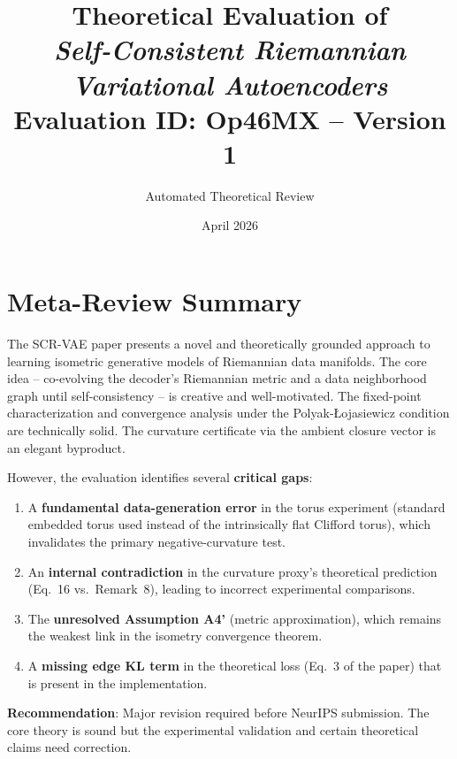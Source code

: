 \documentclass{article}
\title{Theoretical Evaluation of\\
\emph{Self-Consistent Riemannian Variational Autoencoders}\\[6pt]
\large Evaluation ID: Op46MX -- Version 1}
\author{Automated Theoretical Review}
\date{April 2026}
\begin{document}
\maketitle

\tableofcontents
\newpage

\section{Meta-Review Summary}

\begin{verdict}
The SCR-VAE paper presents a novel and theoretically grounded approach to
learning isometric generative models of Riemannian data manifolds. The core
idea -- co-evolving the decoder's Riemannian metric and a data neighborhood
graph until self-consistency -- is creative and well-motivated. The fixed-point
characterization and convergence analysis under the Polyak-\L{}ojasiewicz
condition are technically solid. The curvature certificate via the ambient
closure vector is an elegant byproduct.

However, the evaluation identifies several \textbf{critical gaps}:
\begin{enumerate}[label=(\roman*)]
    \item A \textbf{fundamental data-generation error} in the torus experiment
      (standard embedded torus used instead of the intrinsically flat Clifford
      torus), which invalidates the primary negative-curvature test.
    \item An \textbf{internal contradiction} in the curvature proxy's
      theoretical prediction (Eq.~16 vs.\ Remark~8), leading to incorrect
      experimental comparisons.
    \item The \textbf{unresolved Assumption A4'} (metric approximation), which
      remains the weakest link in the isometry convergence theorem.
    \item A \textbf{missing edge KL term} in the theoretical loss (Eq.~3 of the
      paper) that is present in the implementation.
\end{enumerate}

\noindent
\textbf{Recommendation}: Major revision required before NeurIPS submission. The
core theory is sound but the experimental validation and certain theoretical
claims need correction.
\end{verdict}
\end{document}
